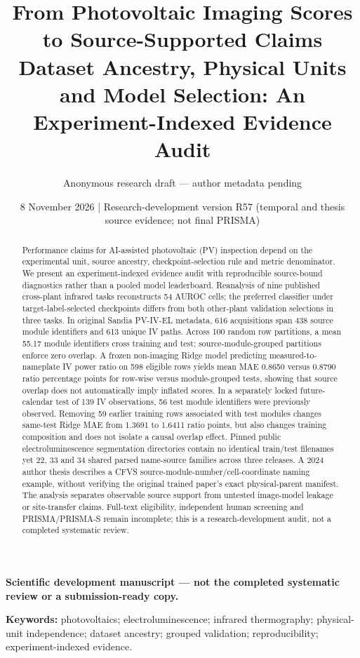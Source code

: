 \documentclass[10pt,a4paper]{article}
\title{From Photovoltaic Imaging Scores to Source-Supported Claims\\
\large Dataset Ancestry, Physical Units and Model Selection: An Experiment-Indexed Evidence Audit}
\author{Anonymous research draft --- author metadata pending}
\date{8 November 2026 \;|\; Research-development version R57 (temporal and thesis source evidence; not final PRISMA)}
\newcommand{\papertype}{\textbf{Scientific development manuscript --- not the completed systematic review or a submission-ready copy.}}
\begin{document}
\maketitle
\begin{center}\small\papertype\end{center}
\begin{abstract}
Performance claims for AI-assisted photovoltaic (PV) inspection depend on the experimental unit, source ancestry, checkpoint-selection rule and metric denominator. We present an experiment-indexed evidence audit with reproducible source-bound diagnostics rather than a pooled model leaderboard. Reanalysis of nine published cross-plant infrared tasks reconstructs 54 AUROC cells; the preferred classifier under target-label-selected checkpoints differs from both other-plant validation selections in three tasks. In original Sandia PV-IV-EL metadata, 616 acquisitions span 438 source module identifiers and 613 unique IV paths. Across 100 random row partitions, a mean 55.17 module identifiers cross training and test; source-module-grouped partitions enforce zero overlap. A frozen non-imaging Ridge model predicting measured-to-nameplate IV power ratio on 598 eligible rows yields mean MAE 0.8650 versus 0.8790 ratio percentage points for row-wise versus module-grouped tests, showing that source overlap does not automatically imply inflated scores. In a separately locked future-calendar test of 139 IV observations, 56 test module identifiers were previously observed. Removing 59 earlier training rows associated with test modules changes same-test Ridge MAE from 1.3691 to 1.6411 ratio points, but also changes training composition and does not isolate a causal overlap effect. Pinned public electroluminescence segmentation directories contain no identical train/test filenames yet 22, 33 and 34 shared parsed name-source families across three releases. A 2024 author thesis describes a CFVS source-module-number/cell-coordinate naming example, without verifying the original trained paper's exact physical-parent manifest. The analysis separates observable source support from untested image-model leakage or site-transfer claims. Full-text eligibility, independent human screening and PRISMA/PRISMA-S remain incomplete; this is a research-development audit, not a completed systematic review.
\end{abstract}
\noindent\textbf{Keywords:} photovoltaics; electroluminescence; infrared thermography; physical-unit independence; dataset ancestry; grouped validation; reproducibility; experiment-indexed evidence.
\end{document}
